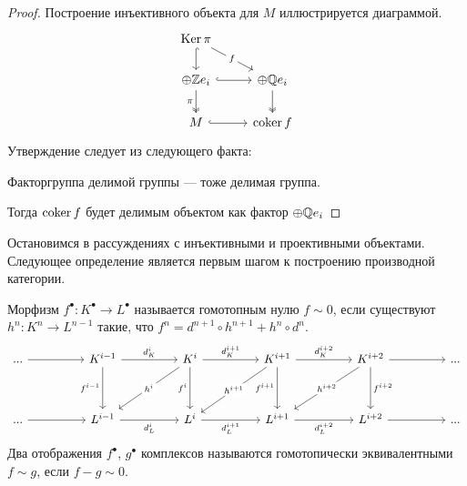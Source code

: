\documentclass[../main.tex]{subfiles}
\begin{document}
\begin{proof}
    Построение инъективного объекта для $M$ иллюстрируется диаграммой.
    \begin{equation}
        \begin{tikzcd}
	{\Ker \pi} \\
	{\oplus \Z e_i} & {\oplus \Q e_i} \\
	M & {\coker f}
	\arrow[hook, from=2-1, to=2-2]
	\arrow["\pi"', two heads, from=2-1, to=3-1]
	\arrow[hook, from=1-1, to=2-1]
	\arrow["f"{description}, from=1-1, to=2-2]
	\arrow[two heads, from=2-2, to=3-2]
	\arrow[hook, from=3-1, to=3-2]
\end{tikzcd}
    \end{equation}
    Утверждение следует из следующего факта:
    \begin{to_suj}
    Факторгруппа делимой группы --- тоже делимая группа.
    \end{to_suj}
    Тогда $\operatorname{coker} f$ будет делимым объектом как фактор $\oplus \mathbb{Q} e_i$
\end{proof}
Остановимся в рассуждениях с инъективными и проективными объектами. Следующее определение является первым шагом к построению производной категории.
\begin{to_def}
Морфизм $f^\bullet:K^\bullet \to L^\bullet$ называется гомотопным нулю $f\sim 0$, если существуют $h^n:K^n\to L^{n-1}$ такие, что $f^n = d^{n+1}\circ h^{n+1} + h^{n}\circ d^{n}$.
\begin{equation*}
    \begin{tikzcd}[sep=huge]
	{...} & {K^{i-1}} & {K^i} & {K^{i+1}} & {K^{i+2}} & {...} \\
	{...} & {L^{i-1}} & {L^i} & {L^{i+1}} & {L^{i+2}} & {...}
	\arrow[from=1-1, to=1-2]
	\arrow["{d_K^i}", from=1-2, to=1-3]
	\arrow["{d_K^{i+1}}", from=1-3, to=1-4]
	\arrow[from=1-5, to=1-6]
	\arrow[from=2-1, to=2-2]
	\arrow["{d_L^i}"', from=2-2, to=2-3]
	\arrow["{d_L^{i+1}}"', from=2-3, to=2-4]
	\arrow["{d_L^{i+2}}"', from=2-4, to=2-5]
	\arrow[from=2-5, to=2-6]
	\arrow["{f^{i-1}}"', from=1-2, to=2-2]
	\arrow["{f^i}"', from=1-3, to=2-3]
	\arrow["{f^{i+1}}"', from=1-4, to=2-4]
	\arrow["{f^{i+2}}", from=1-5, to=2-5]
	\arrow["{d_K^{i+2}}", from=1-4, to=1-5]
	\arrow["{h^i}"{description}, from=1-3, to=2-2]
	\arrow["{h^{i+1}}"{description}, from=1-4, to=2-3]
	\arrow["{h^{i+2}}"{description}, from=1-5, to=2-4]
\end{tikzcd}
\end{equation*}
Два отображения $f^\bullet$, $g^\bullet$ комплексов называются гомотопически эквивалентными $f\sim g$, если $f-g \sim 0$.
\end{to_def}
\end{document}
